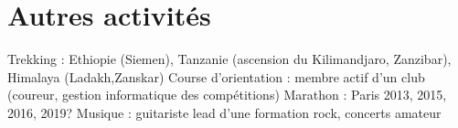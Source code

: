 
\section{Autres activités}

\small{
Trekking : Ethiopie (Siemen), Tanzanie (ascension du Kilimandjaro, Zanzibar), Himalaya (Ladakh,Zanskar) 
\newline
Course d'orientation : membre actif d'un club (coureur, gestion informatique des compétitions)
\newline
Marathon : Paris 2013, 2015, 2016, 2019?
\newline
Musique : guitariste lead d'une formation rock, concerts amateur
}

